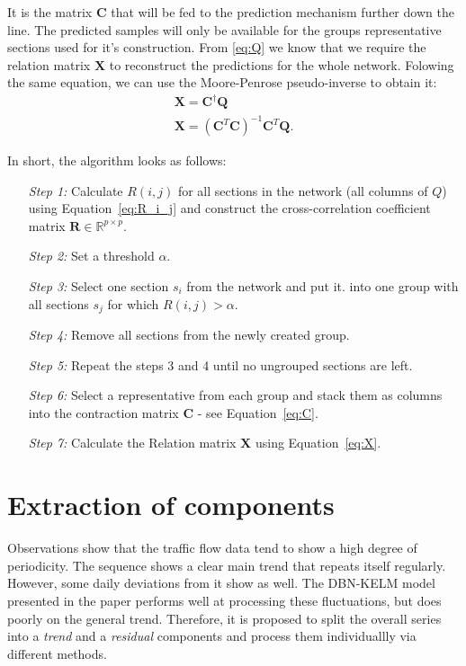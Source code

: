 It is the matrix $\mathbf{C}$ that will be fed to the prediction mechanism
further down the line. The predicted samples will only be available for the
groups representative sections used for it's construction. From \ref{eq:Q} we
know that we require the relation matrix $\mathbf{X}$ to reconstruct the 
predictions for the whole network. Folowing the same equation, we can use the
Moore-Penrose pseudo-inverse to obtain it:
\begin{equation}
	\begin{gathered}
		\mathbf{X}=\mathbf{C}^\dagger\mathbf{Q}\\
		\mathbf{X}=(\mathbf{C}^T\mathbf{C})^{-1}\mathbf{C}^T\mathbf{Q}.
	\end{gathered}
	\label{eq:X}
\end{equation}

In short, the algorithm looks as follows:
\begin{itemize}
	\setlength{\itemindent}{2em}
	\item[\textit{Step 1:}] Calculate $R(i,j)$ for all sections in the network
	(all columns of $Q$) using Equation~\ref{eq:R_i_j} and construct the
	cross-correlation coefficient matrix
    $\mathbf{R}\in\mathbb{R}^{p\times p}$.
	\item[\textit{Step 2:}] Set a threshold $\alpha$.
	\item[\textit{Step 3:}] Select one section $s_i$ from the network and put it.
	into one group with all sections $s_j$ for which $R(i,j)>\alpha$.
	\item[\textit{Step 4:}] Remove all sections from the newly created group.
	\item[\textit{Step 5:}] Repeat the steps 3 and 4 until no ungrouped sections
	are left.
	\item[\textit{Step 6:}] Select a representative from each group and stack
	them as columns into the contraction matrix $\mathbf{C}$ - see
	Equation~\ref{eq:C}.
	\item[\textit{Step 7:}] Calculate the Relation matrix $\mathbf{X}$ using
	Equation~\ref{eq:X}.
\end{itemize}


\section{Extraction of components} \label{sec:extraction-of-components}

Observations show that the traffic flow data tend to show a high degree of
periodicity. The sequence shows a clear main trend that repeats itself
regularly. However, some daily deviations from it show as well. The DBN-KELM
model presented in the paper performs well at processing these fluctuations, but
does poorly on the general trend. Therefore, it is proposed to split the overall
series into a \textit{trend} and a \textit{residual} components and process them
individuallly via different methods.

